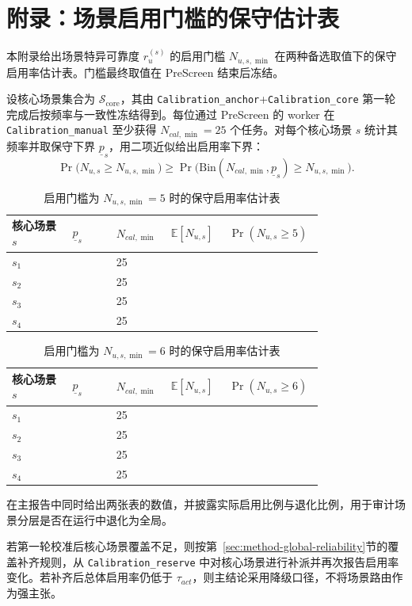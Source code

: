 \section{附录：场景启用门槛的保守估计表}\label{app:activation-threshold}

本附录给出场景特异可靠度 $r_u^{(s)}$ 的启用门槛 $N_{u,s,\min}$ 在两种备选取值下的保守启用率估计表。门槛最终取值在 PreScreen 结束后冻结。

设核心场景集合为 $\mathcal{S}_{\mathrm{core}}$，其由 \texttt{Calibration\_anchor}+\texttt{Calibration\_core} 第一轮完成后按频率与一致性冻结得到。每位通过 PreScreen 的 worker 在 \texttt{Calibration\_manual} 至少获得 $N_{cal,\min}=25$ 个任务。对每个核心场景 $s$ 统计其频率并取保守下界 $\underline{p}_s$，用二项近似给出启用率下界：
\[\Pr\bigl(N_{u,s}\ge N_{u,s,\min}\bigr)\ge \Pr\bigl(\mathrm{Bin}(N_{cal,\min},\underline{p}_s)\ge N_{u,s,\min}\bigr).\]

\begin{table}[H]
\centering
\caption{启用门槛为 $N_{u,s,\min}=5$ 时的保守启用率估计表}
\label{tab:activation-nusmin-5}
\small
\begin{tabular}{p{0.18\linewidth} p{0.13\linewidth} p{0.13\linewidth} p{0.16\linewidth} p{0.18\linewidth}}
\toprule
\textbf{核心场景 $s$} & $\underline{p}_s$ & $N_{cal,\min}$ & $\mathbb{E}[N_{u,s}]$ & $\Pr\left(N_{u,s}\ge 5\right)$ \\
\midrule
$s_1$ &  & 25 &  &  \\
$s_2$ &  & 25 &  &  \\
$s_3$ &  & 25 &  &  \\
$s_4$ &  & 25 &  &  \\
\bottomrule
\end{tabular}
\end{table}
\FloatBarrier

\begin{table}[H]
\centering
\caption{启用门槛为 $N_{u,s,\min}=6$ 时的保守启用率估计表}
\label{tab:activation-nusmin-6}
\small
\begin{tabular}{p{0.18\linewidth} p{0.13\linewidth} p{0.13\linewidth} p{0.16\linewidth} p{0.18\linewidth}}
\toprule
\textbf{核心场景 $s$} & $\underline{p}_s$ & $N_{cal,\min}$ & $\mathbb{E}[N_{u,s}]$ & $\Pr\left(N_{u,s}\ge 6\right)$ \\
\midrule
$s_1$ &  & 25 &  &  \\
$s_2$ &  & 25 &  &  \\
$s_3$ &  & 25 &  &  \\
$s_4$ &  & 25 &  &  \\
\bottomrule
\end{tabular}
\end{table}

在主报告中同时给出两张表的数值，并披露实际启用比例与退化比例，用于审计场景分层是否在运行中退化为全局。

若第一轮校准后核心场景覆盖不足，则按第~\ref{sec:method-global-reliability}节的覆盖补齐规则，从 \texttt{Calibration\_reserve} 中对核心场景进行补派并再次报告启用率变化。若补齐后总体启用率仍低于 $\tau_{act}$，则主结论采用降级口径，不将场景路由作为强主张。